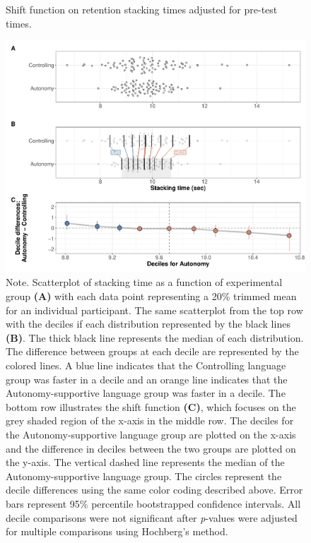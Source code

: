 \documentclass[doc,floatsintext,donotrepeattitle,letterpaper,12pt]{apa7}
\begin{document}
\begin{figure}[htbp]
    \caption{Shift function on retention stacking times adjusted for pre-test times.}
    \centering
    \includegraphics[scale=0.55]{../../figs/fig1.pdf}
    \setlength{\belowcaptionskip}{-2em}
    \caption*{\singlespacing \small Note. \normalfont Scatterplot of stacking time as a function of experimental group \textbf{(A)} with each data point representing a 20\% trimmed mean for an individual participant. The same scatterplot from the top row with the deciles if each distribution represented by the black lines \textbf{(B)}. The thick black line represents the median of each distribution. The difference between groups at each decile are represented by the colored lines. A blue line indicates that the Controlling language group was faster in a decile and an orange line indicates that the Autonomy-supportive language group was faster in a decile. The bottom row illustrates the shift function \textbf{(C)}, which focuses on the grey shaded region of the x-axis in the middle row. The deciles for the Autonomy-supportive language group are plotted on the x-axis and the difference in deciles between the two groups are plotted on the y-axis. The vertical dashed line represents the median of the Autonomy-supportive language group. The circles represent the decile differences using the same color coding described above. Error bars represent 95\% percentile bootstrapped confidence intervals. All decile comparisons were not significant after \emph{p}-values were adjusted for multiple comparisons using Hochberg's method.}
    \label{fig:fig1}
\end{figure}
\end{document}
